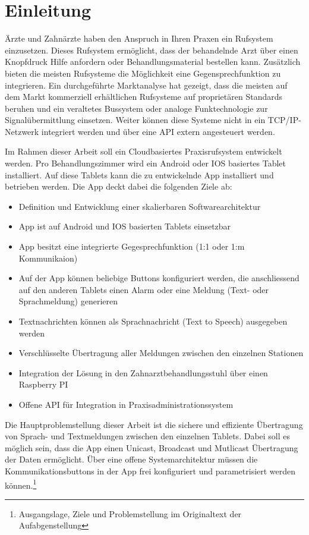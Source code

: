 \section{Einleitung}

Ärzte und Zahnärzte haben den Anspruch in Ihren Praxen ein Rufsystem einzusetzen.
Dieses Rufsystem ermöglicht, dass der behandelnde Arzt über einen Knopfdruck Hilfe anfordern oder Behandlungsmaterial bestellen kann.
Zusätzlich bieten die meisten Rufsysteme die Möglichkeit eine Gegensprechfunktion zu integrieren.
Ein durchgeführte Marktanalyse hat gezeigt, dass die meisten auf dem Markt kommerziell erhältlichen Rufsysteme auf proprietären Standards beruhen und ein veraltetes Bussystem oder analoge Funktechnologie zur Signalübermittlung einsetzen.
Weiter können diese Systeme nicht in ein TCP/IP-Netzwerk integriert werden und über eine API extern angesteuert werden.

Im Rahmen dieser Arbeit soll ein Cloudbasiertes Praxisrufsystem entwickelt werden.
Pro Behandlungszimmer wird ein Android oder IOS basiertes Tablet installiert.
Auf diese Tablets kann die zu entwickelnde App installiert und betrieben werden.
Die App deckt dabei die folgenden Ziele ab:

\begin{itemize}
    \item Definition und Entwicklung einer skalierbaren Softwarearchitektur
    \item App ist auf Android und IOS basierten Tablets einsetzbar
    \item App besitzt eine integrierte Gegesprechfunktion (1:1 oder 1:m Kommunikaion)
    \item Auf der App können beliebige Buttons konfiguriert werden, die anschliessend auf den anderen Tablets einen Alarm oder eine Meldung (Text- oder Sprachmeldung) generieren
    \item Textnachrichten können als Sprachnachricht (Text to Speech) ausgegeben werden
    \item Verschlüsselte Übertragung aller Meldungen zwischen den einzelnen Stationen
    \item Integration der Lösung in den Zahnarztbehandlungsstuhl über einen Raspberry PI
    \item Offene API für Integration in Praxisadministrationssystem
\end{itemize}

Die Hauptproblemstellung dieser Arbeit ist die sichere und effiziente Übertragung von Sprach- und Textmeldungen zwischen den einzelnen Tablets.
Dabei soll es möglich sein, dass die App einen Unicast, Broadcast und Mutlicast Übertragung der Daten ermöglicht.
Über eine offene Systemarchitektur müssen die Kommunikationsbuttons in der App frei konfiguriert und parametrisiert werden können.\cite{aufgabenstellung}\footnote{Ausgangslage, Ziele und Problemstellung im Originaltext der Aufabgenstellung}

